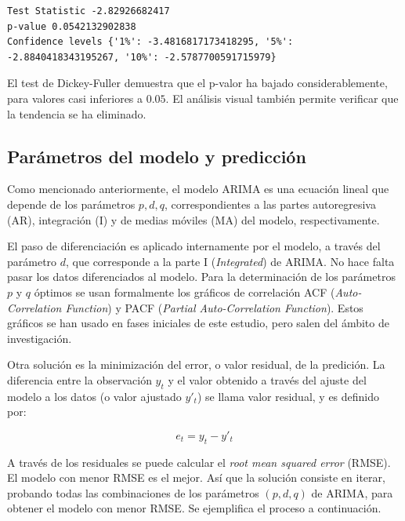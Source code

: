\documentclass[11pt,spanish,listoffigures,listoftables]{tfgetsinf}
\begin{document}
    \begin{lstlisting}[caption=Resultados del test de Dickey-Fuller de {\tt statsmodels} de Python., label={lst:adf_test_2}]
Test Statistic -2.82926682417
p-value 0.0542132902838
Confidence levels {'1%': -3.4816817173418295, '5%': -2.8840418343195267, '10%': -2.5787700591715979}
    \end{lstlisting}
    
    El test de Dickey-Fuller demuestra que el p-valor ha bajado considerablemente, para valores casi inferiores a \(0.05\). El análisis visual también permite verificar que la tendencia se ha eliminado.
    
    \subsection{Parámetros del modelo y predicción}
    
    Como mencionado anteriormente, el modelo ARIMA es una ecuación lineal que depende de los parámetros \(p, d, q\), correspondientes a las partes autoregresiva (AR), integración (I) y de medias móviles (MA) del modelo, respectivamente. 
    
    El paso de diferenciación es aplicado internamente por el modelo, a través del parámetro \(d\), que corresponde a la parte I ({\em Integrated}) de ARIMA. No hace falta pasar los datos diferenciados al modelo. Para la determinación de los parámetros \(p\) y \(q\) óptimos se usan formalmente los gráficos de correlación ACF ({\em Auto-Correlation Function}) y PACF ({\em Partial Auto-Correlation Function}). Estos gráficos se han usado en fases iniciales de este estudio, pero salen del ámbito de investigación. 
    
    Otra solución es la minimización del error, o valor residual, de la predición. La diferencia entre la observación \(y_{t}\) y el valor obtenido a través del ajuste del modelo a los datos (o valor ajustado \(y'_{t}\)) se llama valor residual, y es definido por:
    
    \begin{equation}
    e_{t} = y_{t} - y'_{t}
    \end{equation}
    
    A través de los residuales se puede calcular el {\em root mean squared error} (RMSE). El modelo con menor RMSE es el mejor. Así que la solución consiste en iterar, probando todas las combinaciones de los parámetros \((p,d,q)\) de ARIMA, para obtener el modelo con menor RMSE. Se ejemplifica el proceso a continuación.
    
\end{document}
